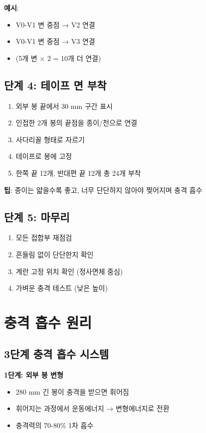 \documentclass[a4paper,12pt]{article}
\begin{document}
\begin{CJK}{UTF8}{mj}
\textbf{예시}:
\begin{itemize}
    \item V0-V1 변 중점 → V2 연결
    \item V0-V1 변 중점 → V3 연결
    \item (5개 변 × 2 = 10개 더 연결)
\end{itemize}

\subsection{단계 4: 테이프 면 부착}

\begin{enumerate}
    \item 외부 봉 끝에서 30 mm 구간 표시
    \item 인접한 2개 봉의 끝점을 종이/천으로 연결
    \item 사다리꼴 형태로 자르기
    \item 테이프로 봉에 고정
    \item 한쪽 끝 12개, 반대편 끝 12개 총 24개 부착
\end{enumerate}

\textbf{팁}: 종이는 얇을수록 좋고, 너무 단단하지 않아야 찢어지며 충격 흡수

\subsection{단계 5: 마무리}

\begin{enumerate}
    \item 모든 접합부 재점검
    \item 흔들림 없이 단단한지 확인
    \item 계란 고정 위치 확인 (정사면체 중심)
    \item 가벼운 충격 테스트 (낮은 높이)
\end{enumerate}

\section{충격 흡수 원리}

\subsection{3단계 충격 흡수 시스템}

\textbf{1단계: 외부 봉 변형}
\begin{itemize}
    \item 280 mm 긴 봉이 충격을 받으면 휘어짐
    \item 휘어지는 과정에서 운동에너지 → 변형에너지로 전환
    \item 충격력의 70-80\% 1차 흡수
\end{itemize}


\end{CJK}
\end{document}
